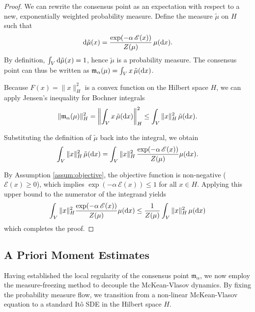 \documentclass[12pt]{amsart}
\newcommand{\D}[1]{\mbox{\rm #1}}
\newcommand{\dd}{\D{d}}
\numberwithin{equation}{section}
\begin{document}
\begin{proof}
We can rewrite the consensus point as an expectation with respect to a new, exponentially weighted probability measure. Define the measure $\tilde{\mu}$ on $H$ such that
\begin{equation*}
    \dd \tilde{\mu}(x) = \frac{\exp(-\alpha \, \mathscr{E}(x))}{Z(\mu)} \,\mu(\dd x).
\end{equation*}
By definition, $\int_V \dd\tilde{\mu}(x) = 1$, hence $\tilde{\mu}$ is a probability measure. The consensus point can thus be written as $\mathfrak{m}_\alpha(\mu) = \int_V x \, \tilde{\mu}(\dd x)$.

Because $F(x) = \|x\|_H^2$ is a convex function on the Hilbert space $H$, we can apply Jensen's inequality for Bochner integrals
\begin{equation*}
    \|\mathfrak{m}_\alpha(\mu)\|_H^2 = \left\| \int_V x \, \tilde{\mu}(\dd x) \right\|_H^2 \leq \int_V \|x\|_H^2 \, \tilde{\mu}(\dd x).
\end{equation*}

Substituting the definition of $\tilde{\mu}$ back into the integral, we obtain
\begin{equation*}
    \int_V \|x\|_H^2 \, \tilde{\mu}(\dd x) = \int_V \|x\|_H^2 \,\frac{\exp(-\alpha\, \mathscr{E}(x))}{Z(\mu)} \mu(\dd x).
\end{equation*}

By Assumption \ref{assum:objective}, the objective function is non-negative ($\mathscr{E}(x) \geq 0$), which implies $\exp(-\alpha \,\mathscr{E}(x)) \leq 1$ for all $x \in H$. Applying this upper bound to the numerator of the integrand yields
\begin{equation*}
    \int_V \|x\|_H^2 \frac{\exp(-\alpha\, \mathscr{E}(x))}{Z(\mu)} \mu(\dd x) \leq \frac{1}{Z(\mu)} \int_V \|x\|_H^2\, \mu(\dd x)
\end{equation*}
which completes the proof.
\end{proof}


\subsection{A Priori Moment Estimates}
\label{sec:moment_estimates}

Having established the local regularity of the consensus point $\mathfrak{m}_{\alpha}$, we now employ the measure-freezing method to decouple the McKean-Vlasov dynamics. By fixing the probability measure flow, we transition from a non-linear McKean-Vlasov equation to a standard It\^o SDE in the Hilbert space $H$.
\end{document}
